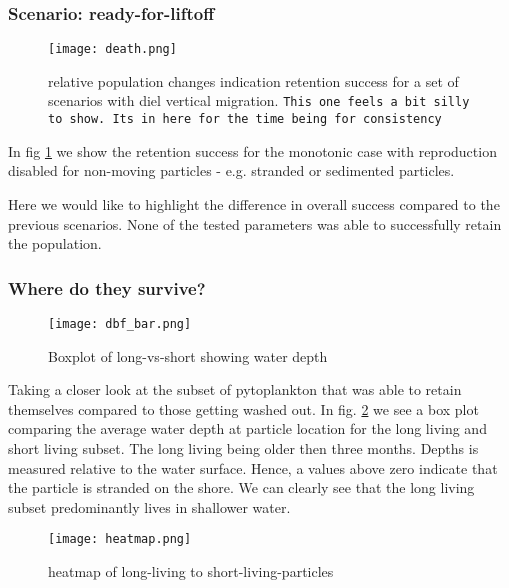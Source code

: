 \subsubsection*{Scenario: ready-for-liftoff}

\begin{figure}
    \texttt{[image: death.png]}
    \caption[]{relative population changes indication retention
    success for a set of scenarios with diel vertical migration. \texttt{This one feels a bit silly to show. Its in here for the time being for consistency}}
    \label{fig:stranded-monotonic-retention-success}
\end{figure}

In fig \ref{fig:stranded-monotonic-retention-success} we show the retention success for the monotonic case with reproduction disabled for non-moving particles - e.g. stranded or sedimented particles.

Here we would like to highlight the difference in overall success compared to the previous scenarios.
None of the tested parameters was able to successfully retain the population.





\subsubsection*{Where do they survive?}

\begin{figure}
    \texttt{[image: dbf\_bar.png]}
    \caption[]{Boxplot of long-vs-short showing water depth}
    \label{fig:migration-long-vs-short}
\end{figure}

Taking a closer look at the subset of pytoplankton that was able to retain themselves compared to those getting washed out.
In fig. \ref{fig:migration-long-vs-short} we see a box plot comparing the average water depth at particle location for the long living and short living subset. The long living being older then three months.
Depths is measured relative to the water surface. Hence, a values above zero indicate that the particle is stranded on the shore.
We can clearly see that the long living subset predominantly lives in shallower water.

\begin{figure}
    \texttt{[image: heatmap.png]}
    \caption[]{heatmap of long-living to short-living-particles}
    \label{fig:migration-long-vs-short-heatmap}
\end{figure}

